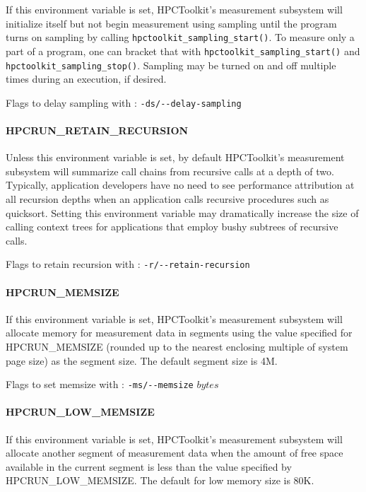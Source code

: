 \sloppy
If this environment variable is set, HPCToolkit's measurement subsystem
will initialize itself but not begin measurement using sampling
until the program turns on sampling by calling
\verb|hpctoolkit_sampling_start()|. To measure only a part of a
program, one can bracket that with \verb|hpctoolkit_sampling_start()|
and \verb|hpctoolkit_sampling_stop()|. Sampling may be turned on
and off multiple times during an execution, if desired.

\parg
Flags to delay sampling with \hpcrun: \verb|-ds/--delay-sampling|

\paragraph{HPCRUN\_RETAIN\_RECURSION}

Unless this environment variable is set, by default HPCToolkit's
measurement subsystem will summarize call chains from recursive calls
at a depth of two. Typically, application developers have no need
to see performance attribution at all recursion depths when an
application calls recursive procedures such as quicksort. Setting
this environment variable may dramatically increase the size of
calling context trees for applications that employ bushy subtrees
of recursive calls.

\parg
Flags to retain recursion with \hpcrun: \verb|-r/--retain-recursion|

\paragraph{HPCRUN\_MEMSIZE}

If this environment variable is set, HPCToolkit's measurement subsystem
will allocate memory for measurement data in segments using the
value specified for HPCRUN\_MEMSIZE (rounded up to the nearest
enclosing multiple of system page size) as the segment size. The
default segment size is 4M.

\parg
Flags to set memsize with \hpcrun: \verb|-ms/--memsize| $bytes$

\paragraph{HPCRUN\_LOW\_MEMSIZE}

If this environment variable is set, HPCToolkit's measurement subsystem
will allocate another segment of measurement data when the amount
of free space available in the current segment is less than the
value specified by HPCRUN\_LOW\_MEMSIZE. The default for low memory
size is 80K.

